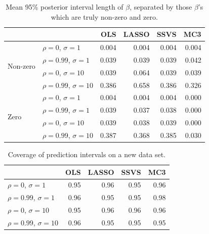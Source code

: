 \documentclass[12pt]{article}
\begin{document}
\begin{table}[H]
\centering
\begin{tabular}{llrrrr}
  \hline\hline
& & OLS & LASSO & SSVS & MC3 \\ 
  \hline
\multirow{4}{*}{Non-zero} & $\rho=0$, $\sigma=1$     & 0.004 & 0.004 & 0.004 & 0.004 \\ 
                          & $\rho=0.99$, $\sigma=1$  & 0.039 & 0.039 & 0.039 & 0.042 \\ 
                          & $\rho=0$, $\sigma=10$    & 0.039 & 0.064 & 0.039 & 0.039 \\ 
                          & $\rho=0.99$, $\sigma=10$ & 0.386 & 0.658 & 0.386 & 0.326 \\ \hline
\multirow{4}{*}{Zero} & $\rho=0$, $\sigma=1$     & 0.004 & 0.004 & 0.004 & 0.000 \\ 
                      & $\rho=0.99$, $\sigma=1$  & 0.039 & 0.037 & 0.038 & 0.000 \\ 
                      & $\rho=0$, $\sigma=10$    & 0.039 & 0.038 & 0.039 & 0.000 \\ 
                      & $\rho=0.99$, $\sigma=10$ & 0.387 & 0.368 & 0.385 & 0.030 \\ 
   \hline\hline
\end{tabular}
\caption{Mean 95\% posterior interval length of $\beta$, separated by those $\beta$'s which are truly non-zero and zero.}
\end{table}

\begin{table}[ht]
\centering
\begin{tabular}{lrrrr}
  \hline\hline
 & OLS & LASSO & SSVS & MC3 \\ 
  \hline
$\rho=0$, $\sigma=1$     & 0.95 & 0.96 & 0.95 & 0.96 \\ 
$\rho=0.99$, $\sigma=1$  & 0.96 & 0.95 & 0.95 & 0.98 \\ 
$\rho=0$, $\sigma=10$    & 0.95 & 0.96 & 0.96 & 0.96 \\ 
$\rho=0.99$, $\sigma=10$ & 0.96 & 0.95 & 0.95 & 0.95 \\ 
   \hline\hline
\end{tabular}
\caption{Coverage of prediction intervals on a new data set.}
\end{table}
\end{document}
